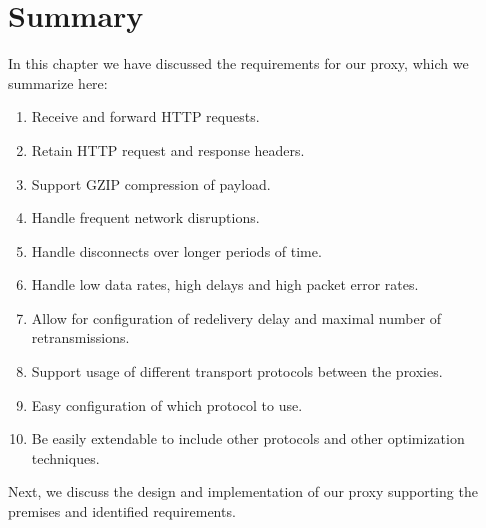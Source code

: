 \section{Summary}

In this chapter we have discussed the requirements for our proxy, which we
summarize here:

\begin{enumerate}
    \item Receive and forward HTTP requests.
    \item Retain HTTP request and response headers.
    \item Support GZIP compression of payload.
    \item Handle frequent network disruptions.
    \item Handle disconnects over longer periods of time.
    \item Handle low data rates, high delays and high packet error rates.
    \item Allow for configuration of redelivery delay and maximal number of retransmissions.
    \item Support usage of different transport protocols between the proxies.
    \item Easy configuration of which protocol to use.
    \item Be easily extendable to include other protocols and other optimization techniques.
\end{enumerate}

Next, we discuss the design and implementation of our proxy supporting the
premises and identified requirements.
